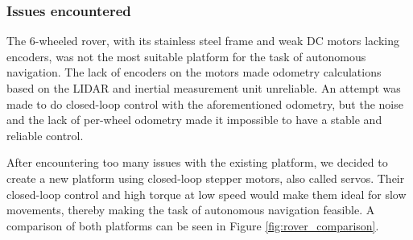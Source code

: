 \documentclass[12pt]{article}
\begin{document}

        \subsubsection{Issues encountered}
            

        The 6-wheeled rover, with its stainless steel frame and weak DC motors lacking encoders, was not the most suitable platform for the task of autonomous navigation. The lack of encoders on the motors made odometry calculations based on the LIDAR and inertial measurement unit unreliable. An attempt was made to do closed-loop control with the aforementioned odometry, but the noise and the lack of per-wheel odometry made it impossible to have a stable and reliable control.

        After encountering too many issues with the existing platform, we decided to create a new platform using closed-loop stepper motors, also called servos. Their closed-loop control and high torque at low speed would make them ideal for slow movements, thereby making the task of autonomous navigation feasible. A comparison of both platforms can be seen in Figure \ref{fig:rover_comparison}.
\end{document}

